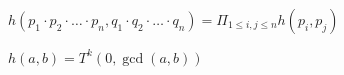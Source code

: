 \begin{enumerate}
$h(p_1\cdot p_2\cdot \ldots \cdot p_n, q_1 \cdot q_2 \cdot \ldots \cdot q_n) =
\Pi_{1 \le i,j \le n} h(p_i, p_j)$

$h(a,b) = T^k(0,\gcd(a,b))$









\end{enumerate}
